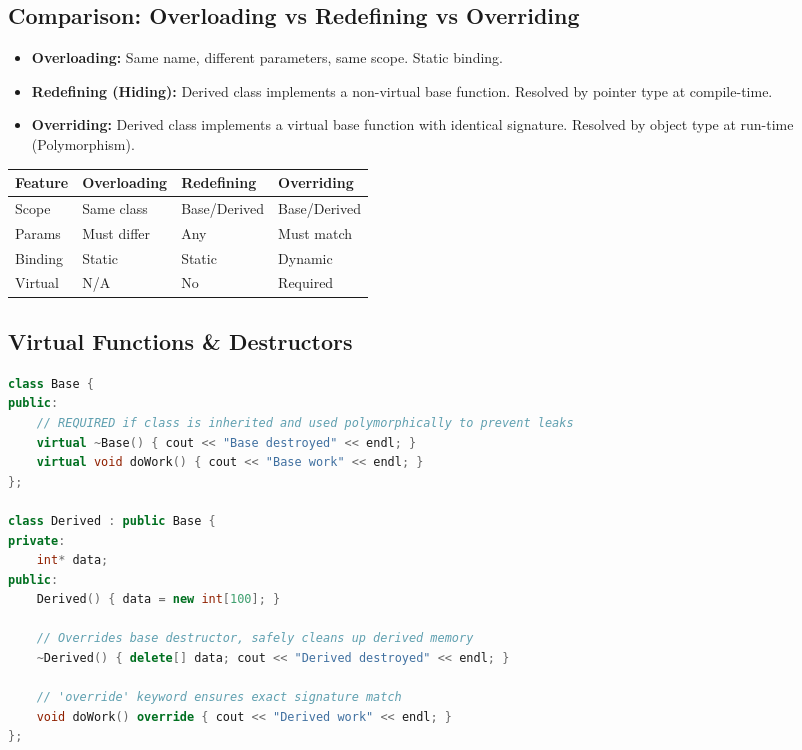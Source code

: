 \documentclass[10pt, a4paper]{article}
\begin{document}
\subsection{Comparison: Overloading vs Redefining vs Overriding}
\begin{itemize}
    \item \textbf{Overloading:} Same name, different parameters, same scope. Static binding.
    \item \textbf{Redefining (Hiding):} Derived class implements a non-virtual base function. Resolved by pointer type at compile-time.
    \item \textbf{Overriding:} Derived class implements a virtual base function with identical signature. Resolved by object type at run-time (Polymorphism).
\end{itemize}

\begin{center}
\begin{tabular}{|l|l|l|l|}
\hline
\textbf{Feature} & \textbf{Overloading} & \textbf{Redefining} & \textbf{Overriding} \\ \hline
Scope & Same class & Base/Derived & Base/Derived \\ \hline
Params & Must differ & Any & Must match \\ \hline
Binding & Static & Static & Dynamic \\ \hline
Virtual & N/A & No & Required \\ \hline
\end{tabular}
\end{center}

\subsection{Virtual Functions \& Destructors}
\begin{lstlisting}[language=C++]
class Base {
public:
    // REQUIRED if class is inherited and used polymorphically to prevent leaks
    virtual ~Base() { cout << "Base destroyed" << endl; }
    virtual void doWork() { cout << "Base work" << endl; }
};

class Derived : public Base {
private:
    int* data;
public:
    Derived() { data = new int[100]; }
    
    // Overrides base destructor, safely cleans up derived memory
    ~Derived() { delete[] data; cout << "Derived destroyed" << endl; }
    
    // 'override' keyword ensures exact signature match
    void doWork() override { cout << "Derived work" << endl; }
};
\end{lstlisting}
\end{document}
